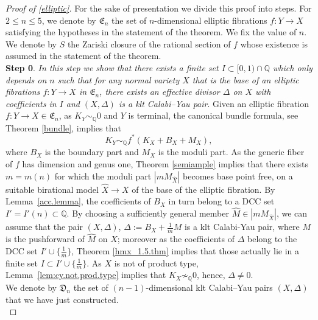 \documentclass{amsart}[12pt,a4paper]
\theoremstyle{definition}
\begin{document}
\begin{proof}[Proof of \ref{elliptic}]
For the sake of presentation we divide this proof into steps.
\newline
For $2\leq n \leq 5$, we denote by $\mathfrak{E}_n$ the set of $n$-dimensional elliptic fibrations $f \colon Y \to X$ satisfying the hypotheses in the statement of the theorem.
We fix the value of $n$.
We denote by $S$ the Zariski closure of the rational section of $f$ whose existence is assumed in the statement of the theorem.\\

{\bf Step 0}. {\it In this step we show that there exists a finite set $I \subset [0, 1) \cap \mathbb{Q}$ which only depends on $n$ such that for any normal variety $X$ that is the base of an elliptic fibrations $f \colon Y \to X$ in $\mathfrak{E}_n$, there exists an effective divisor $\Delta$ on $X$ with coefficients in $I$ and $(X, \Delta)$ is a klt Calabi--Yau pair}.
\newline
Given an elliptic fibration $f \colon Y \to X \in \mathfrak{E}_n$, as $K_Y \sim_\mathbb{Q} 0$ and $Y$ is terminal, the canonical bundle formula, see Theorem \ref{bundle}, implies that 
\[
K_Y \sim_\mathbb{Q} f^\ast(K_X+B_X+M_X),
\]
where $B_X$ is the boundary part and $M_X$ is the moduli part.
As the generic fiber of $f$ has dimension and genus one, Theorem \ref{semiample} implies that there exists $m=m(n)$ for which the moduli part $|mM_{\hat{X}}|$ becomes base point free, on a suitable birational model $\hat{X} \to X$ of the base of the elliptic fibration.
By Lemma~\ref{acc.lemma}, the coefficients of $B_X$ in turn belong to a DCC set $I'=I'(n) \subset \mathbb{Q}$.
By choosing a sufficiently general member $\hat{M} \in |mM_{\hat{X}}|$, we can assume that the pair $(X, \Delta)$, $\Delta:= B_X+\frac{1}{m}M$ is a klt Calabi-Yau pair, where $M$ is the pushforward of $\hat{M}$ on $X$; 
moreover as the coefficients of $\Delta$ belong to the DCC set $I' \cup \{\frac 1 m\}$, Theorem \ref{hmx_1.5.thm} implies that those actually lie in a finite set $I \subset I' \cup \{\frac 1 m\}$.
As $X$ is not of product type, Lemma~\ref{lem:cy.not.prod.type} implies that $K_X \not \sim_\mathbb{Q} 0$, hence, $\Delta \neq 0$.
\\

\noindent
We denote by $\mathfrak{D}_n$ the set of $(n-1)$-dimensional klt Calabi--Yau pairs $(X, \Delta)$ that we have just constructed.\\


\end{proof}
\end{document}
